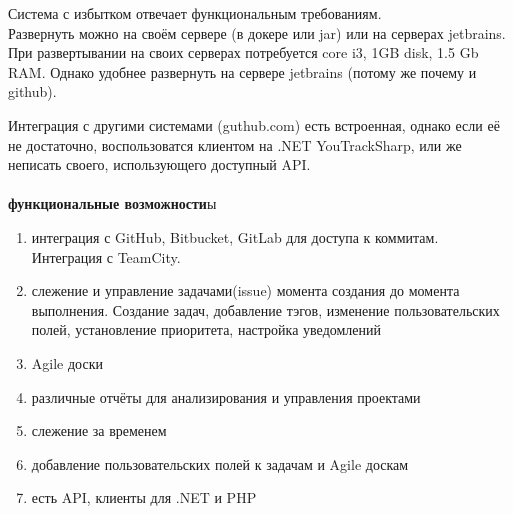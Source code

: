 \documentclass{article}
\begin{document}

Система с избытком отвечает функциональным требованиям.\\
Развернуть можно на своём сервере (в докере или jar) или на серверах jetbrains.
При развертывании на своих серверах потребуется core i3, 1GB disk, 1.5 Gb RAM.
Однако удобнее развернуть на сервере jetbrains (потому же почему и github).

Интеграция с другими системами (guthub.com) есть встроенная, однако если её не достаточно, воспользоватся клиентом на .NET
YouTrackSharp, или же неписать своего, использующего доступный API.
\\\\
\textbf{функциональные возможности}ы
\begin{enumerate}
    \item{интеграция с GitHub, Bitbucket, GitLab для доступа к коммитам. Интеграция с TeamCity.}
    \item{слежение и управление задачами(issue) момента создания до момента выполнения. Создание задач, добавление тэгов, изменение пользовательских полей, установление приоритета, настройка уведомлений}
    \item{Agile доски}
    \item{различные отчёты для анализирования и управления проектами}
    
    \item{слежение за временем}
    \item{добавление пользовательских полей к задачам и Agile доскам}
    \item{есть API, клиенты для .NET и PHP}
\end{enumerate}
\end{document}
